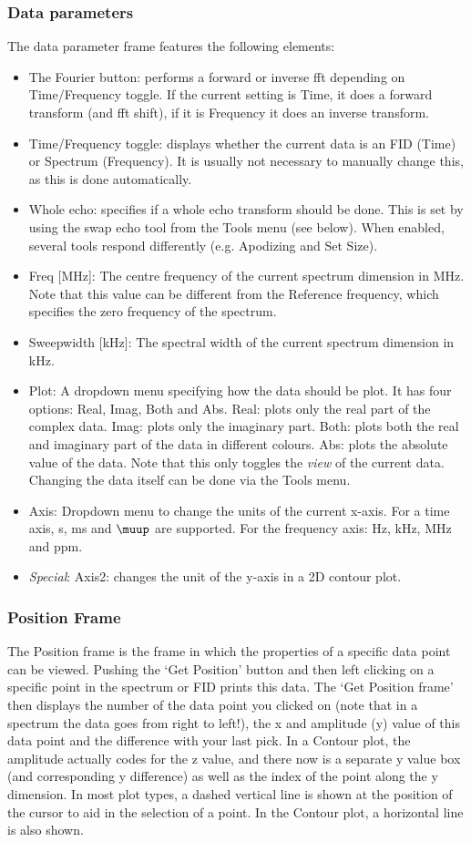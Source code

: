 \documentclass[11pt,a4paper]{article}
\begin{document}
\subsubsection*{Data parameters}
The data parameter frame features the following elements:
\begin{itemize}
\item The Fourier button: performs a forward or inverse fft depending on Time/Frequency toggle. If the current setting is Time, it does a forward transform (and fft shift), if it is Frequency it does an inverse transform.
\item Time/Frequency toggle: displays whether the current data is an FID (Time) or Spectrum (Frequency). It is usually not necessary to manually change this, as this is done automatically.
\item Whole echo: specifies if a whole echo transform should be done. This is set by using the swap echo tool from the Tools menu (see below). When enabled, several tools respond differently (e.g. Apodizing and Set Size).
\item Freq [MHz]: The centre frequency of the current spectrum dimension in MHz. Note that this value can be different from the Reference frequency, which specifies the zero frequency of the spectrum.
\item Sweepwidth [kHz]: The spectral width of the current spectrum dimension in kHz.
\item Plot: A dropdown menu specifying how the data should be plot. It has four options: Real, Imag, Both and Abs. Real: plots only the real part of the complex data. Imag: plots only the imaginary part. Both: plots both the real and imaginary part of the data in different colours. Abs: plots the absolute value of the data. Note that this only toggles the \textit{view} of the current data. Changing the data itself can be done via the Tools menu.
\item Axis: Dropdown menu to change the units of the current x-axis. For a time axis, s, ms and $\muup$ are supported. For the frequency axis: Hz, kHz, MHz and ppm.
\item \textit{Special}: Axis2: changes the unit of the y-axis in a 2D contour plot.
\end{itemize}

\subsubsection*{Position Frame}
The Position frame is the frame in which the properties of a specific data point can be viewed.
Pushing the `Get Position'  button and then left clicking on a specific point in the spectrum or FID
prints this data. The `Get Position frame' then displays the number of the data point you clicked on
(note that in a spectrum the data goes from right to left!), the x and amplitude (y) value of this
data point and the difference with your last pick. In a Contour plot, the amplitude actually codes
for the z value, and there now is a separate y value box (and corresponding y difference) as well as
the index of the point along the y dimension. In most plot types, a dashed vertical line is shown at
the position of the cursor to aid in the selection of a point. In the Contour plot, a horizontal
line is also shown.
\end{document}
